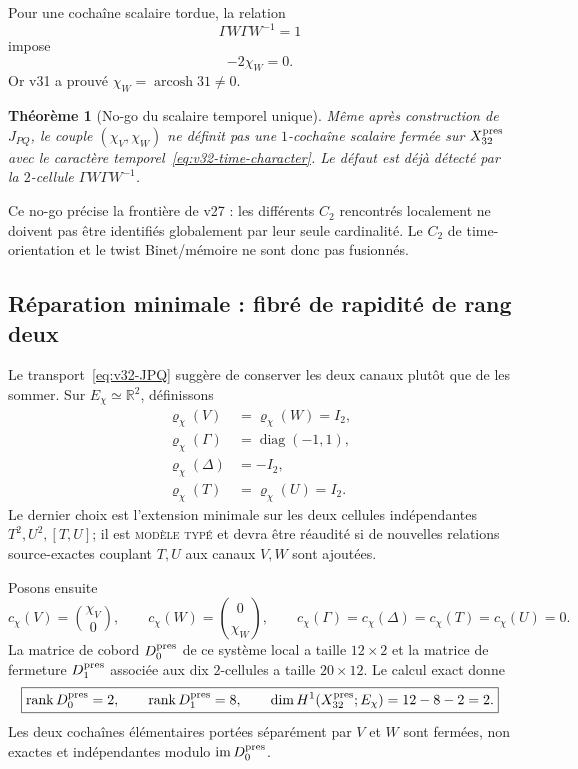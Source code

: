 \documentclass[11pt,a4paper]{article}
\newtheorem{theorem}{Théorème}[section]
\newcommand{\rank}{\operatorname{rank}}
\newcommand{\statusTyped}{\textsc{modèle typé}}
\begin{document}
Pour une cochaîne scalaire tordue, la relation
\[
 \Gamma W\Gamma W^{-1}=1
\]
impose
\begin{equation}\label{eq:v32-scalar-W-obstruction}
 \boxed{-2\chi_W=0.}
\end{equation}
Or v31 a prouvé $\chi_W=\operatorname{arcosh}31\neq0$.

\begin{theorem}[No-go du scalaire temporel unique]\label{thm:v32-scalar-chi-nogo}
Même après construction de $J_{PQ}$, le couple $(\chi_V,\chi_W)$ ne définit pas une $1$-cochaîne
scalaire fermée sur $X_{32}^{\rm pres}$ avec le caractère temporel~\eqref{eq:v32-time-character}.
Le défaut est déjà détecté par la $2$-cellule $\Gamma W\Gamma W^{-1}$.
\end{theorem}

Ce no-go précise la frontière de v27 : les différents $C_2$ rencontrés localement ne doivent pas
être identifiés globalement par leur seule cardinalité. Le $C_2$ de time-orientation et le twist
Binet/mémoire ne sont donc pas fusionnés.

\subsection{Réparation minimale : fibré de rapidité de rang deux}

Le transport~\eqref{eq:v32-JPQ} suggère de conserver les deux canaux plutôt que de les sommer.
Sur $E_\chi\simeq\mathbb R^2$, définissons
\begin{equation}\label{eq:v32-rhochi}
\begin{aligned}
 \varrho_\chi(V)&=\varrho_\chi(W)=I_2,\\
 \varrho_\chi(\Gamma)&=\operatorname{diag}(-1,1),\\
 \varrho_\chi(\Delta)&=-I_2,\\
 \varrho_\chi(T)&=\varrho_\chi(U)=I_2.
\end{aligned}
\end{equation}
Le dernier choix est l'extension minimale sur les deux cellules indépendantes $T^2,U^2,[T,U]$;
il est \statusTyped{} et devra être réaudité si de nouvelles relations source-exactes couplant
$T,U$ aux canaux $V,W$ sont ajoutées.

Posons ensuite
\begin{equation}\label{eq:v32-vector-chi}
 c_\chi(V)=\binom{\chi_V}{0},\qquad
 c_\chi(W)=\binom{0}{\chi_W},\qquad
 c_\chi(\Gamma)=c_\chi(\Delta)=c_\chi(T)=c_\chi(U)=0.
\end{equation}
La matrice de cobord $D_0^{\rm pres}$ de ce système local a taille $12\times2$ et la matrice de
fermeture $D_1^{\rm pres}$ associée aux dix $2$-cellules a taille $20\times12$. Le calcul exact donne
\begin{equation}\label{eq:v32-vector-ranks}
 \boxed{
 \rank D_0^{\rm pres}=2,
 \qquad
 \rank D_1^{\rm pres}=8,
 \qquad
 \dim H^1(X_{32}^{\rm pres};E_\chi)=12-8-2=2.}
\end{equation}
Les deux cochaînes élémentaires portées séparément par $V$ et $W$ sont fermées, non exactes et
indépendantes modulo $\operatorname{im}D_0^{\rm pres}$.
\end{document}
